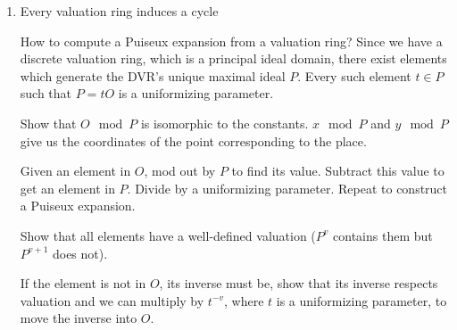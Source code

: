 \begin{theorem}
\begin{enumerate}

If the uniformizing variables are compatible (they have order one at both places), then either $x$ or $y$
will have different expansions at the two places in terms of $v$, so subtract off
the common prefix $p$ (a polynomial in $v$) to get $(x-p)/v^r$ where $r$ is the order
of $x-p$.  $(x-p)/v^r - c_A$ will be zero on $A$ and non-zero on $B$.  Inverting it
will produce an element with a pole at $A$ and finite at $B$.  This element will
be in $B$'s valuation ring but not in $A$'s.


\item Every valuation ring induces a cycle

How to compute a Puiseux expansion from a valuation ring?  Since we have a discrete
valuation ring, which is a principal ideal domain, there exist elements which generate
the DVR's unique maximal ideal $P$.  Every such element $t \in P$ such that $P=tO$ is a uniformizing parameter.

Show that $O \mod P$ is isomorphic to the constants.  $x \mod P$ and $y \mod P$ give us the coordinates
of the point corresponding to the place.

Given an element in $O$, mod out by $P$ to find its value.  Subtract this value to get an element in $P$.
Divide by a uniformizing parameter.  Repeat to construct a Puiseux expansion.

Show that all elements have a well-defined valuation ($P^v$ contains them but $P^{v+1}$ does not).

If the element is not in $O$, its inverse must be, show that its inverse respects valuation and we can
multiply by $t^{-v}$, where $t$ is a uniformizing parameter, to move the inverse into $O$.


\end{enumerate}
\end{theorem}

